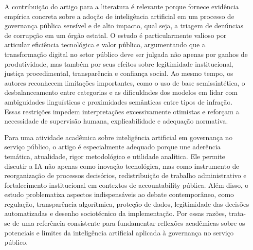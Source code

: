 \documentclass[12pt,a4paper]{article}
\begin{document}
A contribuição do artigo para a literatura é relevante porque fornece evidência empírica concreta sobre a adoção de inteligência artificial em um processo de governança pública sensível e de alto impacto, qual seja, a triagem de denúncias de corrupção em um órgão estatal. O estudo é particularmente valioso por articular eficiência tecnológica e valor público, argumentando que a transformação digital no setor público deve ser julgada não apenas por ganhos de produtividade, mas também por seus efeitos sobre legitimidade institucional, justiça procedimental, transparência e confiança social. Ao mesmo tempo, os autores reconhecem limitações importantes, como o uso de base semissintética, o desbalanceamento entre categorias e as dificuldades dos modelos em lidar com ambiguidades linguísticas e proximidades semânticas entre tipos de infração. Essas restrições impedem interpretações excessivamente otimistas e reforçam a necessidade de supervisão humana, explicabilidade e adequação normativa.

Para uma atividade acadêmica sobre inteligência artificial em governança no serviço público, o artigo é especialmente adequado porque une aderência temática, atualidade, rigor metodológico e utilidade analítica. Ele permite discutir a IA não apenas como inovação tecnológica, mas como instrumento de reorganização de processos decisórios, redistribuição de trabalho administrativo e fortalecimento institucional em contextos de accountability pública. Além disso, o estudo problematiza aspectos indispensáveis ao debate contemporâneo, como regulação, transparência algorítmica, proteção de dados, legitimidade das decisões automatizadas e desenho sociotécnico da implementação. Por essas razões, trata-se de uma referência consistente para fundamentar reflexões acadêmicas sobre os potenciais e limites da inteligência artificial aplicada à governança no serviço público.

\printbibliography
\end{document}
